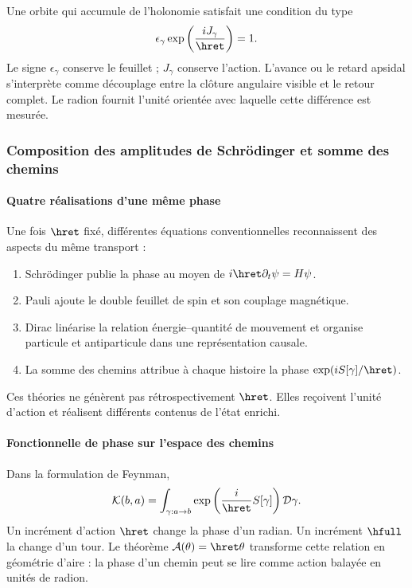 Une orbite qui accumule de l'holonomie satisfait une condition du type
\begin{equation}
\epsilon_\gamma\exp\left(\frac{iJ_\gamma}{\hret}\right)=1.
\label{eq:holonomy-action}
\end{equation}
Le signe \(\epsilon_\gamma\) conserve le feuillet ; \(J_\gamma\) conserve
l'action. L'avance ou le retard apsidal s'interprète comme découplage entre
la clôture angulaire visible et le retour complet. Le radion fournit
l'unité orientée avec laquelle cette différence est mesurée.

\subsubsection{Composition des amplitudes de Schrödinger et somme des chemins}

\paragraph{Quatre réalisations d'une même phase}

Une fois \(\hret\) fixé, différentes équations conventionnelles reconnaissent
des aspects du même transport :
\begin{enumerate}
\item Schrödinger publie la phase au moyen de
\(i\hret\partial_t\psi=H\psi\).
\item Pauli ajoute le double feuillet de spin et son couplage magnétique.
\item Dirac linéarise la relation énergie--quantité de mouvement et organise particule et
antiparticule dans une représentation causale.
\item La somme des chemins attribue à chaque histoire la phase
\(\exp(iS[\gamma]/\hret)\).
\end{enumerate}
Ces théories ne génèrent pas rétrospectivement \(\hret\). Elles reçoivent l'unité
d'action et réalisent différents contenus de l'état enrichi.

\paragraph{Fonctionnelle de phase sur l'espace des chemins}

Dans la formulation de Feynman,
\begin{equation}
\mathcal K(b,a)=\int_{\gamma:a\to b}
\exp\left(\frac{i}{\hret}S[\gamma]\right)\mathcal D\gamma.
\label{eq:path-integral}
\end{equation}
Un incrément d'action \(\hret\) change la phase d'un radian. Un incrément
\(\hfull\) la change d'un tour. Le théorème
\(\mathcal A(\theta)=\hret\theta\) transforme cette relation en géométrie
d'aire : la phase d'un chemin peut se lire comme action balayée en unités de
radion.

